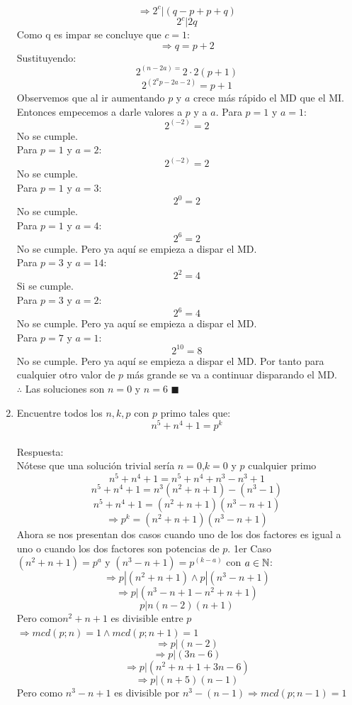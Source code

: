 \documentclass{book}
\begin{document}
\begin{enumerate}
        $$\Rightarrow 2^c|(q-p+p+q)$$
        $$2^c|2q$$
        Como q es impar se concluye que $c=1$:
        $$\Rightarrow q=p+2$$
        Sustituyendo:
        $$2^{(n-2a)=}2\cdot 2(p+1)$$
        $$2^{(2^a p-2a-2)}=p+1$$
        Observemos que al ir aumentando $p$ y $a$ crece más rápido el MD que el MI. Entonces empecemos a darle valores a $p$ y a $a$.
        Para $p=1$ y $a=1$:
        $$2^{(-2)}=2$$
        No se cumple.\\
        Para $p=1$ y $a=2$:
        $$2^{(-2)}=2$$
        No se cumple.\\
        Para $p=1$ y $a=3$:
        $$2^0=2$$
        No se cumple.\\
        Para $p=1$ y $a=4$:
        $$2^6=2$$
        No se cumple. Pero ya aquí se empieza a dispar el MD.\\
        Para $p=3$ y $a=14$:
        $$2^2=4$$
        Si se cumple.\\
        Para $p=3$ y $a=2$:
        $$2^6=4$$
        No se cumple. Pero ya aquí se empieza a dispar el MD.\\
        Para $p=7$ y $a=1$:
        $$2^{10}=8$$
        No se cumple. Pero ya aquí se empieza a dispar el MD. Por tanto para cualquier otro valor de $p$ más grande se va a continuar disparando el MD.\\
        $\therefore$ Las soluciones son $n=0$ y $n=6$ $\blacksquare$\\
        \item Encuentre todos los $n,k,p$ con $p$ primo tales que:
        $$n^5+n^4+1=p^k$$\\
        Respuesta:\\
        Nótese que una solución trivial sería $ n=0$,$k=0$  y  $p$ cualquier primo
        $$n^5+n^4+1=n^5+n^4+n^3-n^3+1$$
        $$n^5+n^4+1=n^3 (n^2+n+1)-(n^3-1)$$
        $$n^5+n^4+1=(n^2+n+1)(n^3-n+1)$$
        $$\Rightarrow p^k=(n^2+n+1)(n^3-n+1)$$
        Ahora se nos presentan dos casos cuando uno de los dos factores es igual a uno o cuando los dos factores son potencias de $p$.
        1er Caso
        $(n^2+n+1)=p^a$ y $(n^3-n+1)=p^{(k-a)}$ con $a\in\mathbb{N}$:
        $$\Rightarrow p|(n^2+n+1)  \wedge  p|(n^3-n+1)$$
        $$\Rightarrow p|(n^3-n+1-n^2+n+1)$$
        $$p|n(n-2)(n+1)$$
        Pero como$ n^2+n+1$ es divisible entre $p$ $\Rightarrow mcd(p;n)=1\wedge mcd(p;n+1)=1$
        $$\Rightarrow p|(n-2)$$
        $$\Rightarrow p|(3n-6)$$
        $$\Rightarrow p|(n^2+n+1+3n-6)$$
        $$\Rightarrow p|(n+5)(n-1)$$
        Pero como $n^3-n+1$ es divisible por $n^3-(n-1)\Rightarrow mcd(p;n-1)=1$

\end{enumerate}
\end{document}
